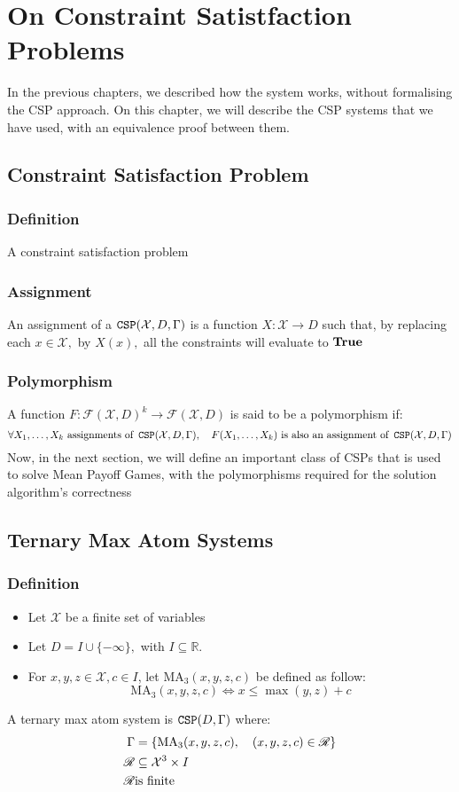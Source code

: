 \chapter{On Constraint Satistfaction Problems}
\label{appendix:CSP}
In the previous chapters, we described how the system works, without formalising the CSP approach.\newline
On this chapter, we will describe the CSP systems that we have used, with an equivalence proof between them.

\section{Constraint Satisfaction Problem}
\subsection{Definition}
A constraint satisfaction problem
\subsection{Assignment}
An assignment of a $\operatorname{\mathtt{CSP}}(\mathcal{X},D,\Gamma)$ is a function $X:\mathcal{X}\rightarrow D$ such that, by replacing each $x\in\mathcal{X},$ by $X(x),$ all the constraints will evaluate to $\operatorname{\textbf{True}}$
\subsection{Polymorphism}
A function $F:\mathscr{F}(\mathcal{X},D)^k\rightarrow \mathscr{F}(\mathcal{X},D)$ is said to be a polymorphism if:
$$
\forall X_1,\dots,X_k \ \text{assignments of}\ \CSP(\mathcal{X},D,\Gamma),\quad F(X_1,\dots,X_k) \ \text{is also an assignment of}\ \CSP(\mathcal{X},D,\Gamma)
$$
Now, in the next section, we will define an important class of CSPs that is used to solve Mean Payoff Games, with the polymorphisms required for the solution algorithm's correctness

\section{Ternary Max Atom Systems}
\subsection{Definition}
\begin{itemize}
	\item Let $\mathcal{X}$ be a finite set of variables
	\item Let $D=I\cup \{-\infty\},$ with $I\subseteq \mathbb{R}$.
	\item  For $x,y,z\in \mathcal{X},c\in I$, let $\text{MA}_3(x,y,z,c)$ be defined as follow:
	$$
	\text{MA}_3(x,y,z,c)\iff x\le \max(y,z)+c
	$$
\end{itemize}
A ternary max atom system is $\operatorname{\mathtt{CSP}}(D,\Gamma)$ where:
\begin{align*}
	\Gamma&=\left\{\text{MA}_3(x,y,z,c),\quad (x,y,z,c)\in \mathscr{R}\right\}\\
	\mathscr{R}&\subseteq \mathcal{X}^3\times I\\
	\mathscr{R}& \space \text{is finite}
\end{align*}
